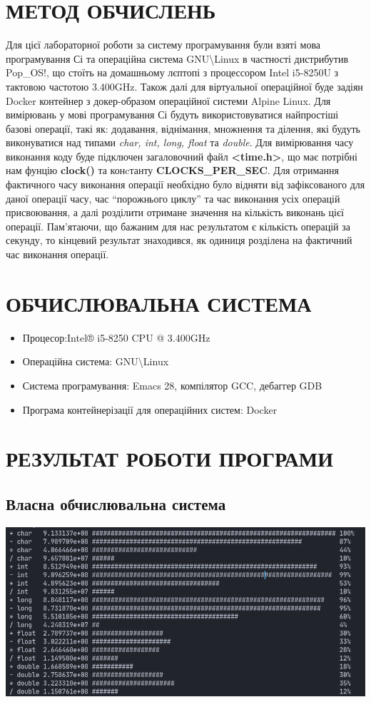 \documentclass[a4paper,12pt]{report}
\begin{document}
\section{МЕТОД ОБЧИСЛЕНЬ}

Для цієї лабораторної роботи за систему програмування були взяті мова програмування Сі та операційна система GNU\textbackslash Linux в частності дистрибутив Pop\_OS!, що стоїть на домашньому лєптопі з процессором Intel i5-8250U з тактовою частотою 3.400GHz. Також далі для віртуальної операційної буде задіян Docker контейнер з докер-образом операційної системи Alpine Linux. Для вимірювань у мові програмування Сі будуть використовуватися найпростіші базові операції, такі як: додавання, віднімання, множнення та ділення, які будуть виконуватися над типами \textit{char, int, long, float} та \textit{double}. Для вимірювання часу виконання коду буде підключен загаловочний файл \textbf{<time.h>}, що має потрібні нам фунцію \textbf{clock()} та конcтанту \textbf{CLOCKS\_PER\_SEC}. Для отримання фактичного часу виконання операції необхідно було відняти від зафіксованого для даної операції часу, час “порожнього циклу” та час виконання усіх операцій присвоювання, а далі розділити отримане значення  на кількість виконань цієї операції.  Пам’ятаючи, що бажаним для нас результатом є кількість операцій за секунду, то кінцевий результат знаходився, як одиниця розділена на фактичний час виконання операції.

\section{ОБЧИСЛЮВАЛЬНА СИСТЕМА}
\begin{itemize}
  \item{Процесор:Intel® i5-8250 CPU @ 3.400GHz}
  \item{Операційна система: GNU\textbackslash Linux}
  \item{Система програмування: Emacs 28, компілятор GCC, дебаггер GDB}
  \item{Програма контейнерізації для операційних систем: Docker}
\end{itemize}

\section{РЕЗУЛЬТАТ РОБОТИ ПРОГРАМИ}
\subsection{Власна обчислювальна система}
\begin{center}\includegraphics[scale=0.4]{main}\end{center}
\end{document}
